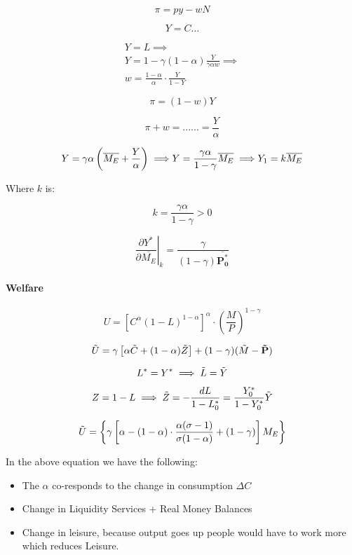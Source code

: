 $$
\pi = py - wN
$$


$$
Y = C ...
$$

\begin{align}
    Y = L \implies \\
    Y = 1 - \gamma \left( 1 - \alpha  \right) \frac{Y}{ \gamma \alpha w} \implies \\
    w = \frac{1 - \alpha}{\alpha} \cdot \frac{Y}{1 - Y}
\end{align}



$$
\pi = (1 - w)Y
$$

$$
\pi + w = ...... = \frac{Y}{\alpha}
$$


$$
Y = \gamma \alpha \left( \overline{M_E} + \frac{Y}{\alpha}     \right) \implies \\
Y = \frac{\gamma \alpha}{1 - \gamma}\overline{M_E} \implies \\
Y_1 = k \overline{M_E}
$$

Where $k$ is:

$$
k = \frac{\gamma \alpha}{1 - \gamma} > 0
$$


$$
 \left. \frac{\partial Y^*}{\partial \overline{M_E}} \right\rvert_{k} = \frac{\gamma}{(1 - \gamma)\mathbf{\overline{P_0^*}}}
 $$
 
 \paragraph{Welfare}
 
 $$
 U = \left[ C^{\alpha} (1-L)^{1-\alpha}   \right]^{\alpha} \cdot \left( \frac{M}{P}    \right)^{1 - \gamma}
 $$
 
 
 $$
 \Tilde{U} = \gamma \left[  \alpha \Tilde{C} + (1 - \alpha)\Tilde{Z}   \right] + (1 - \gamma)(\Tilde{M} - \mathbf{\Tilde{P}})
 $$

$$
L^* = Y^* \implies \Tilde{L} = \Tilde{Y}
$$

$$
Z = 1 - L \implies \Tilde{Z} = - \frac{dL}{1 - L_0^*} = \frac{Y_0^*}{1 - Y_0^*}\Tilde{Y}
$$


$$
\Tilde{U} = 
\left \{
\gamma \left[ \alpha - (1 - \alpha) \cdot \frac{\alpha (\sigma -1)}{\sigma (1 - \alpha)} + (1 - \gamma)  \right] M_E
\right \}
$$

In the above equation we have the following:
\begin{itemize}
    \item  The $\alpha$ co-responds to the change in consumption $\Delta C$
    \item Change in Liquidity Services + Real Money Balances
    \item Change in leisure, because output goes up people would have to work more which reduces Leisure. 
\end{itemize}

